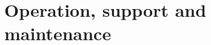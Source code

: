 \documentclass[Main]{subfiles}
\begin{document}
\chapter{Operation, support and maintenance}



%
%

\end{document}
